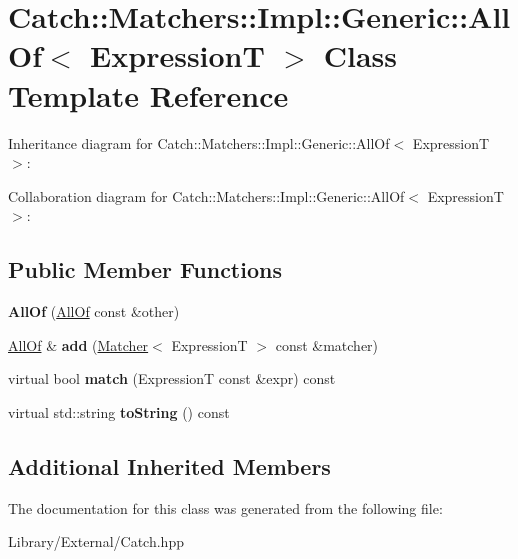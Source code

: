 \hypertarget{class_catch_1_1_matchers_1_1_impl_1_1_generic_1_1_all_of}{}\section{Catch\+:\+:Matchers\+:\+:Impl\+:\+:Generic\+:\+:All\+Of$<$ Expression\+T $>$ Class Template Reference}
\label{class_catch_1_1_matchers_1_1_impl_1_1_generic_1_1_all_of}


Inheritance diagram for Catch\+:\+:Matchers\+:\+:Impl\+:\+:Generic\+:\+:All\+Of$<$ Expression\+T $>$\+:


Collaboration diagram for Catch\+:\+:Matchers\+:\+:Impl\+:\+:Generic\+:\+:All\+Of$<$ Expression\+T $>$\+:
\subsection*{Public Member Functions}
\begin{DoxyCompactItemize}
\item 
\hypertarget{class_catch_1_1_matchers_1_1_impl_1_1_generic_1_1_all_of_a31f7c5e570e79bdf64064ee87c331a59}{}{\bfseries All\+Of} (\hyperlink{class_catch_1_1_matchers_1_1_impl_1_1_generic_1_1_all_of}{All\+Of} const \&other)\label{class_catch_1_1_matchers_1_1_impl_1_1_generic_1_1_all_of_a31f7c5e570e79bdf64064ee87c331a59}

\item 
\hypertarget{class_catch_1_1_matchers_1_1_impl_1_1_generic_1_1_all_of_a8c5cd1e494ab697076da418ee72ac297}{}\hyperlink{class_catch_1_1_matchers_1_1_impl_1_1_generic_1_1_all_of}{All\+Of} \& {\bfseries add} (\hyperlink{struct_catch_1_1_matchers_1_1_impl_1_1_matcher}{Matcher}$<$ Expression\+T $>$ const \&matcher)\label{class_catch_1_1_matchers_1_1_impl_1_1_generic_1_1_all_of_a8c5cd1e494ab697076da418ee72ac297}

\item 
\hypertarget{class_catch_1_1_matchers_1_1_impl_1_1_generic_1_1_all_of_a04534d0ac9e089f4500c3c19054f11ce}{}virtual bool {\bfseries match} (Expression\+T const \&expr) const \label{class_catch_1_1_matchers_1_1_impl_1_1_generic_1_1_all_of_a04534d0ac9e089f4500c3c19054f11ce}

\item 
\hypertarget{class_catch_1_1_matchers_1_1_impl_1_1_generic_1_1_all_of_a9febc1e67acbeff62a32bcbfdc0c8fab}{}virtual std\+::string {\bfseries to\+String} () const \label{class_catch_1_1_matchers_1_1_impl_1_1_generic_1_1_all_of_a9febc1e67acbeff62a32bcbfdc0c8fab}

\end{DoxyCompactItemize}
\subsection*{Additional Inherited Members}


The documentation for this class was generated from the following file\+:\begin{DoxyCompactItemize}
\item 
Library/\+External/Catch.\+hpp\end{DoxyCompactItemize}
